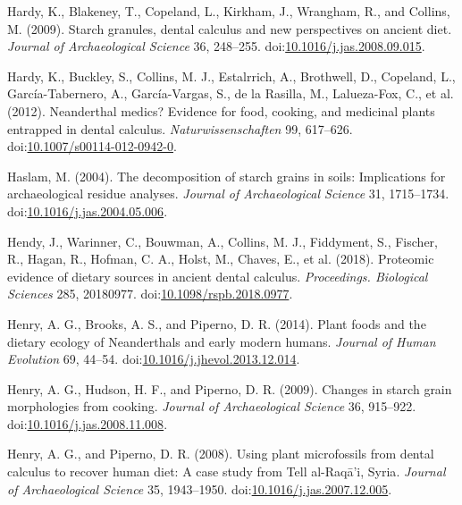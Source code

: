 \documentclass[utf8]{frontiers/frontiersSCNS}
\newlength{\cslhangindent}
\newlength{\cslentryspacingunit} %
\newenvironment{CSLReferences}[2] %
 {%
  \setlength{\parindent}{0pt}
  \ifodd #1
  \let\oldpar\par
  \def\par{\hangindent=\cslhangindent\oldpar}
  \fi
  \setlength{\parskip}{#2\cslentryspacingunit}
 }%
 {}
\begin{document}
\begin{CSLReferences}{1}{0}
\leavevmode{}%
Hardy, K., Blakeney, T., Copeland, L., Kirkham, J., Wrangham, R., and Collins, M. (2009). Starch granules, dental calculus and new perspectives on ancient diet. \emph{Journal of Archaeological Science} 36, 248--255. doi:\href{https://doi.org/10.1016/j.jas.2008.09.015}{10.1016/j.jas.2008.09.015}.

\leavevmode{}%
Hardy, K., Buckley, S., Collins, M. J., Estalrrich, A., Brothwell, D., Copeland, L., García-Tabernero, A., García-Vargas, S., de la Rasilla, M., Lalueza-Fox, C., et al. (2012). Neanderthal medics? {Evidence} for food, cooking, and medicinal plants entrapped in dental calculus. \emph{Naturwissenschaften} 99, 617--626. doi:\href{https://doi.org/10.1007/s00114-012-0942-0}{10.1007/s00114-012-0942-0}.

\leavevmode{}%
Haslam, M. (2004). The decomposition of starch grains in soils: Implications for archaeological residue analyses. \emph{Journal of Archaeological Science} 31, 1715--1734. doi:\href{https://doi.org/10.1016/j.jas.2004.05.006}{10.1016/j.jas.2004.05.006}.

\leavevmode{}%
Hendy, J., Warinner, C., Bouwman, A., Collins, M. J., Fiddyment, S., Fischer, R., Hagan, R., Hofman, C. A., Holst, M., Chaves, E., et al. (2018). Proteomic evidence of dietary sources in ancient dental calculus. \emph{Proceedings. Biological Sciences} 285, 20180977. doi:\href{https://doi.org/10.1098/rspb.2018.0977}{10.1098/rspb.2018.0977}.

\leavevmode{}%
Henry, A. G., Brooks, A. S., and Piperno, D. R. (2014). Plant foods and the dietary ecology of {Neanderthals} and early modern humans. \emph{Journal of Human Evolution} 69, 44--54. doi:\href{https://doi.org/10.1016/j.jhevol.2013.12.014}{10.1016/j.jhevol.2013.12.014}.

\leavevmode{}%
Henry, A. G., Hudson, H. F., and Piperno, D. R. (2009). Changes in starch grain morphologies from cooking. \emph{Journal of Archaeological Science} 36, 915--922. doi:\href{https://doi.org/10.1016/j.jas.2008.11.008}{10.1016/j.jas.2008.11.008}.

\leavevmode{}%
Henry, A. G., and Piperno, D. R. (2008). Using plant microfossils from dental calculus to recover human diet: A case study from {Tell} al-{Raqā}'i, {Syria}. \emph{Journal of Archaeological Science} 35, 1943--1950. doi:\href{https://doi.org/10.1016/j.jas.2007.12.005}{10.1016/j.jas.2007.12.005}.


\end{CSLReferences}
\end{document}
